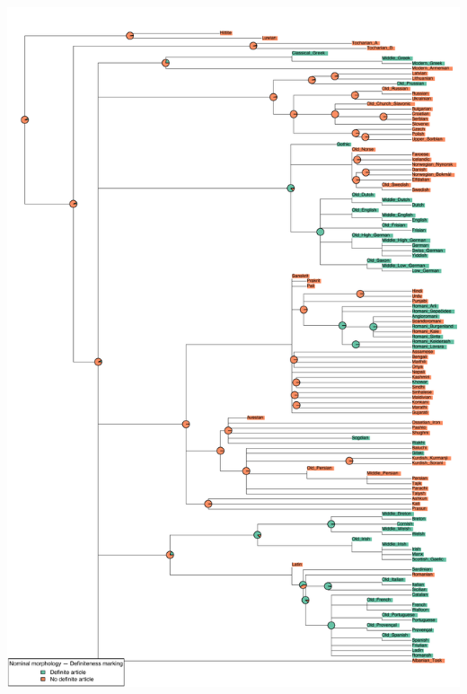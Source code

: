 \includegraphics[width=.9\linewidth]{supp-graphics/NominalmorphologyDefinitenessmarkingDEFART.pdf}

